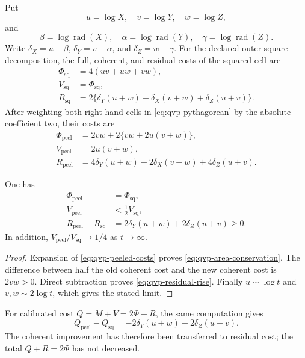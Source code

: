 Put
\[
 u=\log X,\quad v=\log Y,\quad w=\log Z,
\]
and
\[
 \beta=\log\operatorname{rad}(X),\quad
 \alpha=\log\operatorname{rad}(Y),\quad
 \gamma=\log\operatorname{rad}(Z).
\]
Write
$\delta_X=u-\beta$, $\delta_Y=v-\alpha$, and
$\delta_Z=w-\gamma$.  For the declared outer-square decomposition, the
full, coherent, and residual costs of the squared cell are
\begin{align}
 \Phi_{\mathrm{sq}}&=4(uv+uw+vw),\nonumber\\
 V_{\mathrm{sq}}&=\Phi_{\mathrm{sq}},\nonumber\\
 R_{\mathrm{sq}}&=2\{\delta_Y(u+w)+\delta_X(v+w)
                         +\delta_Z(u+v)\}.
 \label{eq:qvp-square-costs}
\end{align}
After weighting both right-hand cells in
\eqref{eq:qvp-pythagorean} by the absolute coefficient two, their costs are
\begin{align}
 \Phi_{\mathrm{peel}}&=2vw+2\{vw+2u(v+w)\},\nonumber\\
 V_{\mathrm{peel}}&=2u(v+w),\nonumber\\
 R_{\mathrm{peel}}&=4\delta_Y(u+w)+2\delta_X(v+w)
                         +4\delta_Z(u+v).
 \label{eq:qvp-peeled-costs}
\end{align}

\begin{proposition}
\label{prop:qvp-cost-redistribution}
One has
\begin{align}
 \Phi_{\mathrm{peel}}&=\Phi_{\mathrm{sq}},
 \label{eq:qvp-area-conservation}\\
 V_{\mathrm{peel}}&<\tfrac12V_{\mathrm{sq}},
 \label{eq:qvp-veronese-drop}\\
 R_{\mathrm{peel}}-R_{\mathrm{sq}}
 &=2\delta_Y(u+w)+2\delta_Z(u+v)\geq0.
 \label{eq:qvp-residual-rise}
\end{align}
In addition,
$V_{\mathrm{peel}}/V_{\mathrm{sq}}\to1/4$ as $t\to\infty$.
\end{proposition}

\begin{proof}
Expansion of \eqref{eq:qvp-peeled-costs} proves
\eqref{eq:qvp-area-conservation}.  The difference between half the old
coherent cost and the new coherent cost is $2vw>0$.  Direct subtraction
proves \eqref{eq:qvp-residual-rise}.  Finally
$u\sim\log t$ and $v,w\sim2\log t$, which gives the stated limit.
\end{proof}

For calibrated cost $Q=M+V=2\Phi-R$, the same computation gives
\begin{equation}
 Q_{\mathrm{peel}}-Q_{\mathrm{sq}}
 =-2\delta_Y(u+w)-2\delta_Z(u+v).
 \label{eq:qvp-q-drop}
\end{equation}
The coherent improvement has therefore been transferred to residual cost;
the total $Q+R=2\Phi$ has not decreased.

